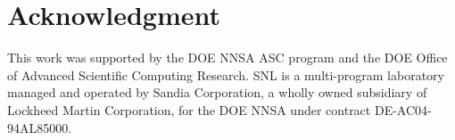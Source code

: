 
\section*{Acknowledgment}
\parindent=0pt
This work was supported by the \gls{DOE} \gls{NNSA} \gls{ASC}
program and the \gls{DOE} Office of Advanced Scientific Computing Research. 
\gls{SNL} is a multi-program laboratory managed and operated by
Sandia Corporation, a wholly owned subsidiary of Lockheed Martin
Corporation, for the \gls{DOE} \gls{NNSA} under contract DE-AC04-94AL85000.


 
